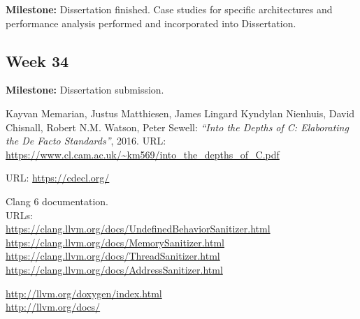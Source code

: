 \documentclass[12pt]{article}
\begin{document}
\textbf{Milestone:} Dissertation finished. Case studies for specific architectures and performance analysis performed and incorporated into Dissertation.

\subsection{Week 34}
\textbf{Milestone:} Dissertation submission.



 
\begin{thebibliography}{9}

  Kayvan Memarian,
  Justus Matthiesen,
  James Lingard Kyndylan Nienhuis,
  David Chisnall, Robert N.M. Watson, Peter Sewell: \textit{``Into the Depths of C: Elaborating the De Facto Standards''}, 2016. URL: \url{https://www.cl.cam.ac.uk/~km569/into_the_depths_of_C.pdf}
  
  URL: \url{https://cdecl.org/}
  
  Clang 6 documentation. \\
  URLs: \\
  \url{https://clang.llvm.org/docs/UndefinedBehaviorSanitizer.html}\\
  \url{https://clang.llvm.org/docs/MemorySanitizer.html}\\
  \url{https://clang.llvm.org/docs/ThreadSanitizer.html}\\
  \url{https://clang.llvm.org/docs/AddressSanitizer.html}
  
 \url{http://llvm.org/doxygen/index.html}\\
 \url{http://llvm.org/docs/}

\end{thebibliography}
\end{document}
